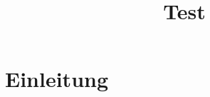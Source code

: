 \documentclass{article}
\title{Test}
\begin{document}
\maketitle

\section{Einleitung}
\end{document}
